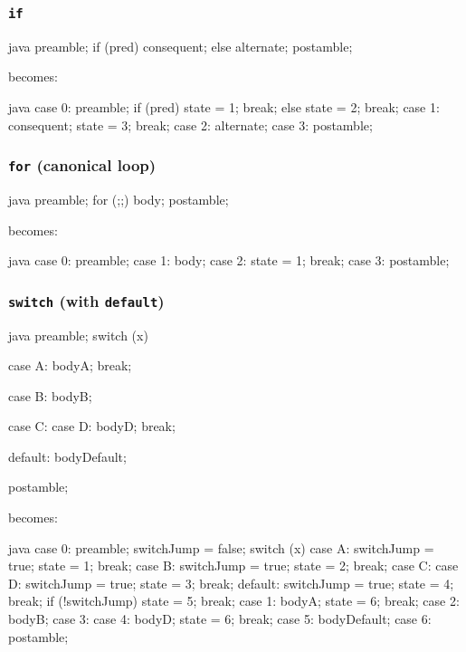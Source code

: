 \documentclass[journal,a4paper]{IEEEtran}
\begin{document}
\subsubsection{\texttt{if}}

\begin{pygmented}{java}
preamble;
if (pred) {
    consequent;
} else {
    alternate;
}
postamble;
\end{pygmented}

becomes:

\begin{pygmented}{java}
case 0:
    preamble;
    if (pred) {
        state = 1;
        break;
    } else {
        state = 2;
        break;
    }
case 1:
    consequent;
    state = 3;
    break;
case 2:
    alternate;
case 3:
    postamble;
\end{pygmented}

\subsubsection{\texttt{for} (canonical loop)}

\begin{pygmented}{java}
preamble;
for (;;) {
    body;
}
postamble;
\end{pygmented}

becomes:

\begin{pygmented}{java}
case 0:
    preamble;
case 1:
    body;
case 2:
    state = 1;
    break;
case 3:
    postamble;
\end{pygmented}

\subsubsection{\texttt{switch} (with \texttt{default})}

\begin{pygmented}{java}
preamble;
switch (x) {
    case A:
        bodyA;
        break;

    case B:
        bodyB;

    case C:
    case D:
        bodyD;
        break;

    default:
        bodyDefault;
}
postamble;
\end{pygmented}

becomes:

\begin{pygmented}{java}
case 0:
    preamble;
    switchJump = false;
    switch (x) {
        case A:
            switchJump = true;
            state = 1;
            break;
        case B:
            switchJump = true;
            state = 2;
            break;
        case C:
        case D:
            switchJump = true;
            state = 3;
            break;
        default:
            switchJump = true;
            state = 4;
            break;
    }
    if (!switchJump) {
        state = 5;
        break;
    }
case 1:
    bodyA;
    state = 6;
    break;
case 2:
    bodyB;
case 3:
case 4:
    bodyD;
    state = 6;
    break;
case 5:
    bodyDefault;
case 6:
    postamble;
\end{pygmented}
\end{document}
